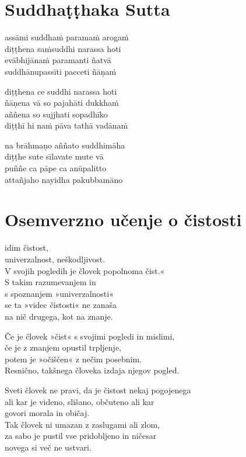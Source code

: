 

\cleartoverso
\chapter*{Suddhaṭṭhaka Sutta}

assāmi suddhaṁ paramaṁ arogaṁ\\
diṭṭhena saṁsuddhi narassa hoti\\
evābhijānaṁ paramanti ñatvā\\
suddhānupassīti pacceti ñāṇaṁ

diṭṭhena ce suddhi narassa hoti\\
ñāṇena vā so pajahāti dukkhaṁ\\
aññena so sujjhati sopadhīko\\
diṭṭhī hi naṁ pāva tathā vadānaṁ

na brāhmaṇo aññato suddhimāha\\
diṭṭhe sute sīlavate mute vā\\
puññe ca pāpe ca anūpalitto\\
attañjaho nayidha pakubbamāno


\cleartorecto
\chapter{Osemverzno učenje o čistosti}

idim čistost,\\ univerzalnost, neškodljivost.\\
V svojih pogledih je človek popolnoma čist.«\\
S takim razumevanjem in\\\vin s spoznanjem »univerzalnosti«\\
se ta »videc čistosti« ne zanaša\\\vin na nič drugega, kot na znanje.

Če je človek »čist« s svojimi pogledi in mislimi,\\
če je z znanjem opustil trpljenje,\\
potem je »očiščen« z nečim posebnim.\\
Resnično, takšnega človeka izdaja njegov pogled.

Sveti človek ne pravi, da je čistost nekaj pogojenega\\
ali kar je videno, slišano, občuteno ali kar\\\vin govori morala in običaj.\\
Tak človek ni umazan z zaslugami ali zlom,\\
za sabo je pustil vse pridobljeno in ničesar\\\vin novega si več ne ustvari.

